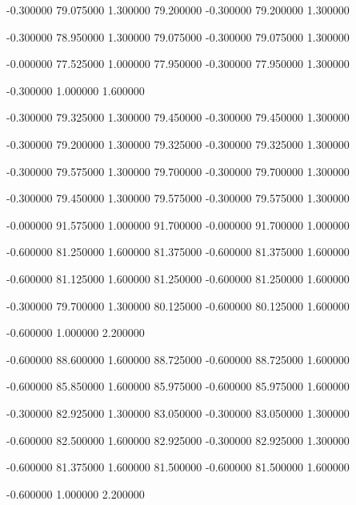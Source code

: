  {-0.300000} {79.075000} {1.300000} {79.200000} {-0.300000} {79.200000} {1.300000}

 {-0.300000} {78.950000} {1.300000} {79.075000} {-0.300000} {79.075000} {1.300000}

 {-0.000000} {77.525000} {1.000000} {77.950000} {-0.300000} {77.950000} {1.300000}

 {-0.300000} {1.000000} {1.600000}

 {-0.300000} {79.325000} {1.300000} {79.450000} {-0.300000} {79.450000} {1.300000}

 {-0.300000} {79.200000} {1.300000} {79.325000} {-0.300000} {79.325000} {1.300000}

 {-0.300000} {79.575000} {1.300000} {79.700000} {-0.300000} {79.700000} {1.300000}

 {-0.300000} {79.450000} {1.300000} {79.575000} {-0.300000} {79.575000} {1.300000}

 {-0.000000} {91.575000} {1.000000} {91.700000} {-0.000000} {91.700000} {1.000000}

 {-0.600000} {81.250000} {1.600000} {81.375000} {-0.600000} {81.375000} {1.600000}

 {-0.600000} {81.125000} {1.600000} {81.250000} {-0.600000} {81.250000} {1.600000}

 {-0.300000} {79.700000} {1.300000} {80.125000} {-0.600000} {80.125000} {1.600000}

 {-0.600000} {1.000000} {2.200000}

 {-0.600000} {88.600000} {1.600000} {88.725000} {-0.600000} {88.725000} {1.600000}

 {-0.600000} {85.850000} {1.600000} {85.975000} {-0.600000} {85.975000} {1.600000}

 {-0.300000} {82.925000} {1.300000} {83.050000} {-0.300000} {83.050000} {1.300000}

 {-0.600000} {82.500000} {1.600000} {82.925000} {-0.300000} {82.925000} {1.300000}

 {-0.600000} {81.375000} {1.600000} {81.500000} {-0.600000} {81.500000} {1.600000}

 {-0.600000} {1.000000} {2.200000}

